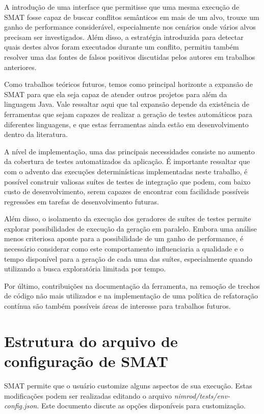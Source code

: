 \documentclass[12pt]{article}
\begin{document}
A introdução de uma interface que permitisse que uma mesma execução de SMAT fosse capaz de buscar conflitos semânticos em mais de um alvo, trouxe um ganho de performance considerável, especialmente nos cenários onde vários alvos precisam ser investigados. Além disso, a estratégia introduzida para detectar quais destes alvos foram executados durante um conflito, permitiu também resolver uma das fontes de falsos positivos discutidas pelos autores em trabalhos anteriores. 

Como trabalhos teóricos futuros, temos como principal horizonte a expansão de SMAT para que ela seja capaz de atender outros projetos para além da linguagem Java. Vale ressaltar aqui que tal expansão depende da existência de ferramentas que sejam capazes de realizar a geração de testes automáticos para diferentes linguagens, e que estas ferramentas ainda estão em desenvolvimento dentro da literatura.	

A nível de implementação, uma das principais necessidades consiste no aumento da cobertura de testes automatizados da aplicação. É importante ressaltar que com o advento das execuções determinísticas implementadas neste trabalho, é possível construir valiosas suítes de testes de integração que podem, com baixo custo de desenvolvimento, serem capazes de encontrar com facilidade possíveis regressões em tarefas de desenvolvimento futuras.

Além disso, o isolamento da execução dos geradores de suítes de testes permite explorar possibilidades de execução da geração em paralelo. Embora uma análise menos criteriosa aponte para a possibilidade de um ganho de performance, é necessário considerar como este comportamento influenciaria a qualidade e o tempo disponível para a geração de cada uma das suítes, especialmente quando utilizando a busca exploratória limitada por tempo.

Por último, contribuições na documentação da ferramenta, na remoção de trechos de código não mais utilizados e na implementação de uma política de refatoração contínua são também possíveis áreas de interesse para trabalhos futuros.




\newpage

\appendix
\section{Estrutura do arquivo de configuração de SMAT} \label{apendice-a}
SMAT permite que o usuário customize alguns aspectos de sua execução. Estas modificações podem ser realizadas editando o arquivo \textit{nimrod/tests/env-config.json}. Este documento discute as opções disponíveis para customização.
\end{document}
